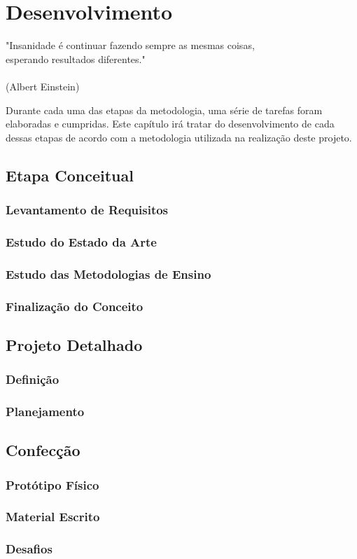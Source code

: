 \chapter{Desenvolvimento}
\label{chap:desen_test}
\begin{flushright}
	"Insanidade é continuar fazendo sempre as mesmas coisas, \\ 
	esperando resultados diferentes." \\
	\ \\
	(Albert Einstein)
\end{flushright}

Durante cada uma das etapas da metodologia, uma série de tarefas foram elaboradas e cumpridas. Este capítulo irá tratar do desenvolvimento de cada dessas etapas de acordo com a metodologia utilizada na realização deste projeto.

\section{Etapa Conceitual}
\subsection{Levantamento de Requisitos}
\subsection{Estudo do Estado da Arte}
\subsection{Estudo das Metodologias de Ensino}
\subsection{Finalização do Conceito}

\section{Projeto Detalhado}
\subsection{Definição}
\subsection{Planejamento}

\section{Confecção}
\subsection{Protótipo Físico}
\subsection{Material Escrito}
\subsection{Desafios}

